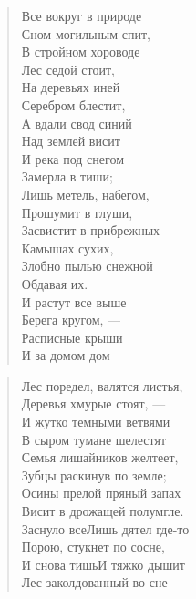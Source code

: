 \newpage
\vspace*{0cm}


\begin{verse}
\begin{patverse}
Все вокруг в природе\\
Сном могильным спит,\\
В стройном хороводе\\
Лес седой стоит,\\
На деревьях иней\\
Серебром блестит,\\
А вдали свод синий\\
Над землей висит\ldotst\\
И река под снегом\\
Замерла в тиши;\\
Лишь метель, набегом,\\
Прошумит в глуши,\\
Засвистит в прибрежных\\
Камышах сухих,\\
Злобно пылью снежной\\
Обдавая их.\\
И растут все выше\\
Берега кругом, --- \\
Расписные крыши\\
И за домом дом\ldotst
\end{patverse}
\end{verse}

\newpage
\vspace*{0cm}


\begin{verse}
\begin{patverse}
Лес поредел, валятся листья,\\
Деревья хмурые стоят, ---\\
И жутко темными ветвями\\
В сыром тумане шелестят\ldotst\\
Семья лишайников желтеет,\\
Зубцы раскинув по земле;\\
Осины прелой пряный запах\\
Висит в дрожащей полумгле.\\
Заснуло все\ldotst Лишь дятел где-то\\
Порою, стукнет по сосне,\\
И снова тишь\ldotst И тяжко дышит\\
Лес заколдованный во сне\ldotst
\end{patverse}
\end{verse}

